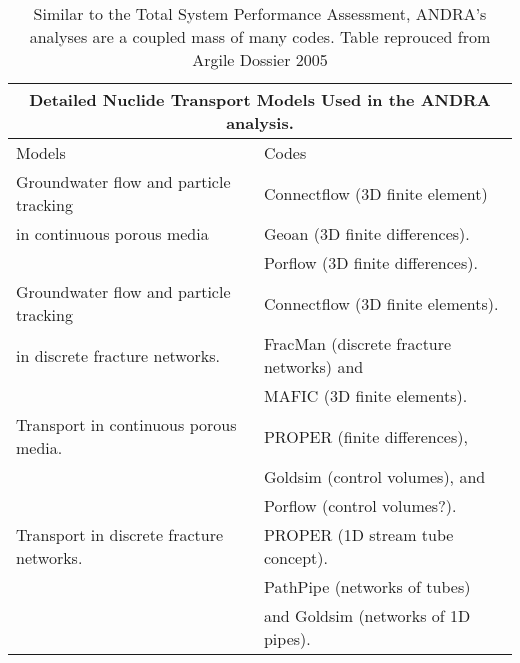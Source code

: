 \begin{table}[h!]
\centering
\footnotesize{
\begin{tabularx}{\textwidth}{|X|X|}
  \multicolumn{2}{c}{\textbf{Detailed Nuclide Transport Models Used in the ANDRA analysis.}}\\
\hline
Models &                                          Codes\\
\hline
Groundwater flow and particle tracking      &  Connectflow (3D finite element)\\
in continuous porous media              &  Geoan (3D finite differences).\\
                                        &  Porflow (3D finite differences).\\
Groundwater flow and particle tracking      &  Connectflow (3D finite elements).\\
in discrete fracture networks.          &  FracMan (discrete fracture networks) and\\
                                        &  MAFIC (3D finite elements).\\
Transport in continuous porous media.   &  PROPER (finite differences),\\
                                        &  Goldsim (control volumes), and\\ 
                                        &  Porflow (control volumes?).\\
Transport in discrete fracture networks.&  PROPER (1D stream tube concept).\\
                                        &  PathPipe (networks of tubes)\\
                                        &  and Goldsim (networks of 1D pipes).\\
\hline
\end{tabularx}
\caption[Contaminant transport codes used by ANDRA]{Similar to the Total System Performance Assessment, ANDRA's analyses are a coupled mass of many codes. Table reprouced from Argile Dossier 2005 \cite{andra_argile:_2005}}
\label{tab:andra}
}
\end{table}
